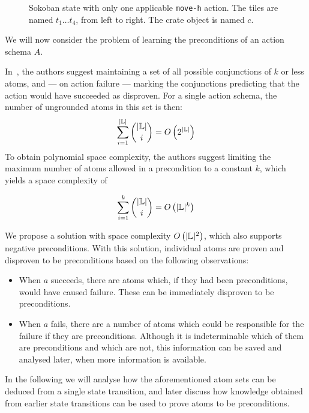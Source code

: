 \documentclass[../Master.tex]{subfiles}
\begin{document}
\begin{figure}
    \centering
    \resizebox{0.4\textwidth}{!}{}
    \caption{\label{fig:sokoSmall} Sokoban state with only one applicable \texttt{move-h} action. The tiles are named $t_1 \dots t_4$, from left to right. The crate object is named $c$.}
\end{figure}

We will now consider the problem of learning the preconditions of an action schema $A$.

In~\cite{Walsh2008}, the authors suggest maintaining a set of all possible conjunctions of $k$ or less atoms, and --- on action failure --- marking the conjunctions predicting that the action would have succeeded as disproven. For a single action schema, the number of ungrounded atoms in this set is then:
\begin{equation*}
    \sum_{i=1}^{|\mathbb{L}|} {{|\mathbb{L}|}\choose{i}} = O \left( 2^{|\mathbb{L}|} \right)
\end{equation*}
To obtain polynomial space complexity, the authors suggest limiting the maximum number of atoms allowed in a precondition to a constant $k$, which yields a space complexity of 

\begin{equation*}
    \sum_{i=1}^{k} {{|\mathbb{L}|}\choose{i}} = O \left( |\mathbb{L}|^k \right)
\end{equation*}

We propose a solution with space complexity $O \left( |\mathbb{L}|^2 \right)$, which also supports negative preconditions. With this solution, individual atoms are proven and disproven to be preconditions based on the following observations:
\begin{itemize}
    \item When $a$ succeeds, there are atoms which, if they had been preconditions, would have caused failure. These can be immediately disproven to be preconditions.
    \item When $a$ fails, there are a number of atoms which could be responsible for the failure if they are preconditions. Although it is indeterminable which of them are preconditions and which are not, this information can be saved and analysed later, when more information is available.
\end{itemize}

In the following we will analyse how the aforementioned atom sets can be deduced from a single state transition, and later discuss how knowledge obtained from earlier state transitions can be used to prove atoms to be preconditions.
\end{document}
